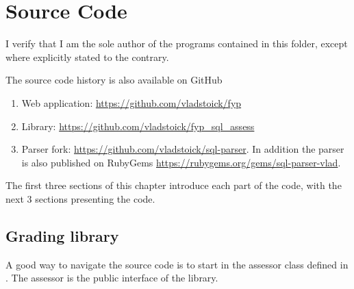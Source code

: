 \chapter{Source Code}

I verify that I am the sole author of the programs contained in this folder, except where explicitly stated to the contrary.

The source code history is also available on GitHub
\begin{enumerate}
    \item Web application: \url{https://github.com/vladstoick/fyp}
    \item Library: \url{https://github.com/vladstoick/fyp_sql_assess}
    \item Parser fork: \url{https://github.com/vladstoick/sql-parser}. In addition the parser is also published on RubyGems \url{https://rubygems.org/gems/sql-parser-vlad}.
\end{enumerate}

The first three sections of this chapter introduce each part of the code, with the next 3 sections presenting the code.

\section{Grading library}

A good way to navigate the source code is to start in the assessor class defined in . The assessor is the public interface of the library.


